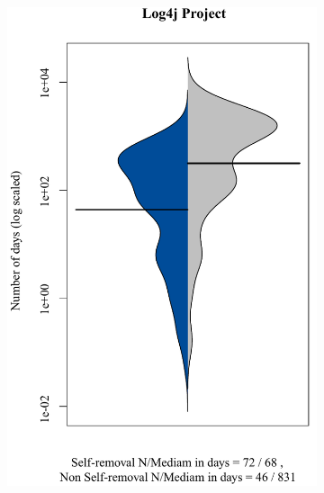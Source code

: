 \begin{figure}[t]
\begin{subfigure}[b]{0.191\textwidth}
		\includegraphics[width=\textwidth]{ben_Log4j.pdf}
		\label{fig:removal_comparison_log4j}
	\end{subfigure}
	\begin{subfigure}[b]{0.195\textwidth}

\end{subfigure}
\end{figure}
